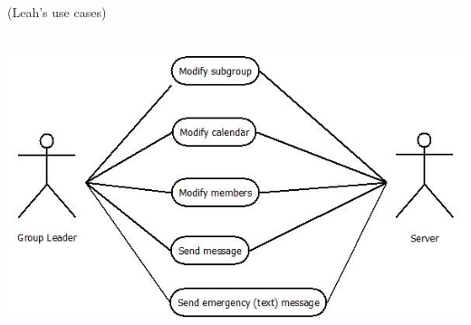 \documentclass[letterpaper]{article}
\begin{document}
\bigskip


\bigskip


\bigskip


\bigskip


\bigskip


\bigskip

{\color{black}
(Leah{\textquoteright}s use cases)}

 \includegraphics[width=6.1516in,height=3.5228in]{Gusspec-img4.jpg} 
\end{document}
